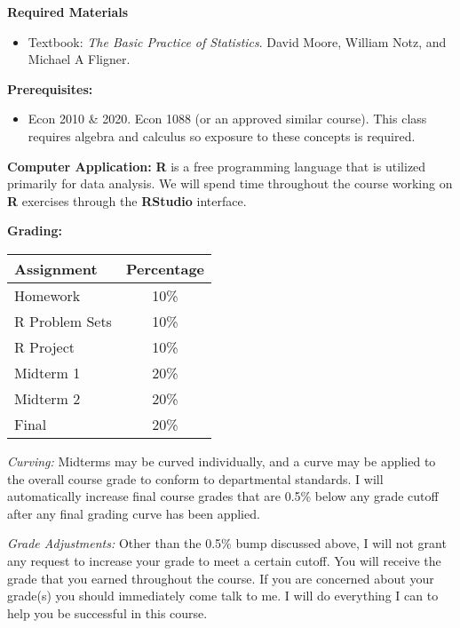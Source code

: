 \documentclass[12pt]{article}
\begin{document}
\vspace{5mm}\noindent 
\textbf{Required Materials}
\begin{itemize}
	\item Textbook: \textit{The Basic Practice of Statistics}. David Moore, William Notz, and Michael A Fligner.  
\end{itemize}

\noindent 
\textbf{Prerequisites:}
\begin{itemize}
	\item Econ 2010 \& 2020. Econ 1088 (or an approved similar course). This class requires algebra and calculus so exposure to these concepts is required. 
\end{itemize} 


\noindent 
\textbf{Computer Application:}
\textbf{R} is a free programming language that is utilized primarily for data analysis. We will spend time throughout the course working on \textbf{R} exercises through the \textbf{RStudio} interface. 

\vspace{5mm}\noindent 
\textbf{Grading:}
\begin{center}
	\small{
        \begin{tabular}{| l | c |}
            \hline
            \textbf{Assignment} & \textbf{Percentage}\\ 
			\hline
			Homework & 10\% \\ \hline
			R Problem Sets & 10\% \\ \hline 
			R Project & 10\% \\ \hline 
			Midterm 1 & 20\% \\ \hline
			Midterm 2 & 20\%  \\ \hline
			Final & 20\%  \\ \hline
		\end{tabular}}
\end{center}


\noindent 
\textit{Curving:} Midterms may be curved individually, and a curve may be applied to the overall course grade to conform to departmental standards. I will automatically increase final course grades that are 0.5\% below any grade cutoff after any final grading curve has been applied.

\noindent
\textit{Grade Adjustments:} Other than the 0.5\% bump discussed above, I will not grant any request to increase your grade to meet a certain cutoff. You will receive the grade that you earned throughout the course. If you are concerned about your grade(s) you should immediately come talk to me. I will do everything I can to help you be successful in this course.
 
\end{document}

